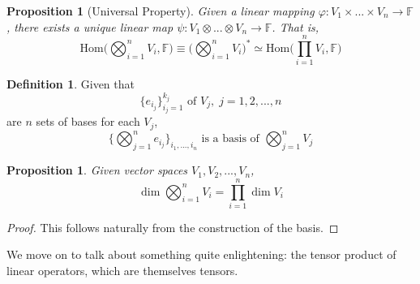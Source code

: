 \documentclass{article}
\newtheorem{proposition}[theorem]{Proposition}
\theoremstyle{remark}
\theoremstyle{definition}
\newtheorem{definition}{Definition}[section]
\begin{document}
\begin{proposition}[Universal Property]
Given a linear mapping $\varphi: V_1 \times ... \times V_n \longrightarrow \mathbb{F}$, there exists a unique linear map $\psi: V_1 \otimes ... \otimes V_n \longrightarrow \mathbb{F}$. That is, 
\[\text{Hom}\Big( \bigotimes_{i=1}^n V_i, \mathbb{F} \Big) \equiv \bigg( \bigotimes_{i=1}^n V_i \bigg)^* \simeq \text{Hom}\Big(\prod_{i=1}^n V_i, \mathbb{F}\Big)\]
\end{proposition}

\begin{definition}
Given that 
\[ \{ e_{i_{j}}\}_{i_{j}=1}^{k_{j}} \text{ of } V_{j},\; j = 1, 2, ..., n\]
are $n$ sets of bases for each $V_{j}$, 
\[ \{ \bigotimes_{j=1}^{n} e_{i_{j}} \}_{i_{1}, ..., i_{n}} \text{ is a basis of } \bigotimes_{j=1}^{n} V_{j}\]
\end{definition}

\begin{proposition}
Given vector spaces $V_1, V_2, ..., V_n$, 
\[ \dim \bigotimes_{i=1}^{n} V_i = \prod_{i=1}^{n} \dim V_{i}\]
\end{proposition}
\begin{proof}
This follows naturally from the construction of the basis.
\end{proof}

We move on to talk about something quite enlightening: the tensor product of linear operators, which are themselves tensors. 
\end{document}
